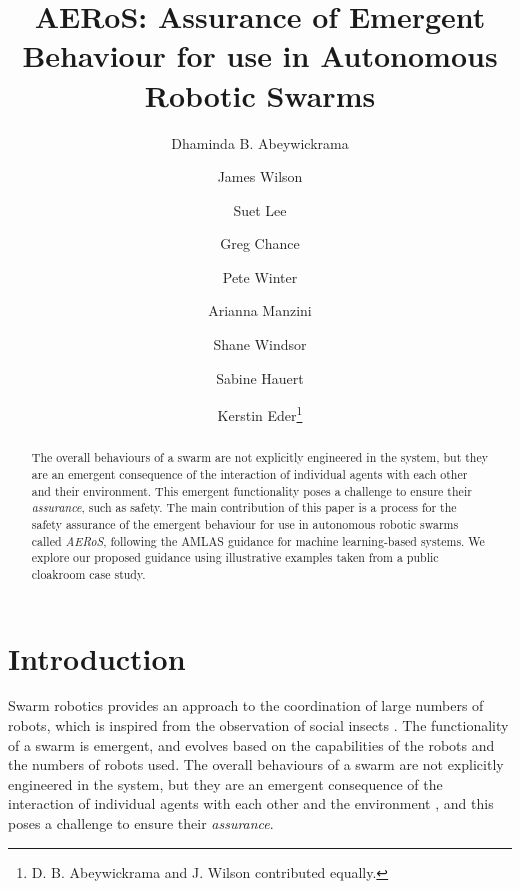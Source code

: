 \documentclass[runningheads]{llncs}
\begin{document}
	\title{AERoS: Assurance of Emergent Behaviour for use in Autonomous Robotic Swarms}%
%
%
\author{Dhaminda B. Abeywickrama\inst{\dag} \and
	James Wilson\inst{\dag} \and
	Suet Lee \and
	Greg Chance \and
	Pete Winter \and
	Arianna Manzini \and
	Shane Windsor \and
	Sabine Hauert \and
	Kerstin Eder\thanks{\dag D. B. Abeywickrama and J. Wilson contributed equally.}}
%
%
%
\maketitle              %
%
\begin{abstract} 
The overall behaviours of a swarm are not explicitly engineered in the system, but they are an emergent consequence of the interaction of individual agents with each other and their environment. 
This emergent functionality poses a challenge to ensure their \emph{assurance}, such as safety. 
The main contribution of this paper is a process for the safety assurance of the emergent behaviour for use in autonomous robotic swarms called \emph{AERoS}, following the AMLAS guidance for machine learning-based systems. 
We explore our proposed guidance using illustrative examples taken from a public cloakroom case study.
	
\end{abstract}


\section{Introduction}\label{introduction}
Swarm robotics provides an approach to the coordination of large numbers of robots, which is inspired from the observation of social insects \cite{Sahin2005}. 
The functionality of a swarm is emergent, and evolves based on the capabilities of the robots and the numbers of robots used. 
The overall behaviours of a swarm are not explicitly engineered in the system, but they are an emergent consequence of the interaction of individual agents with each other and the environment \cite{Abeywickrama2022}, and this poses a challenge to ensure their \emph{assurance}. 
\end{document}
